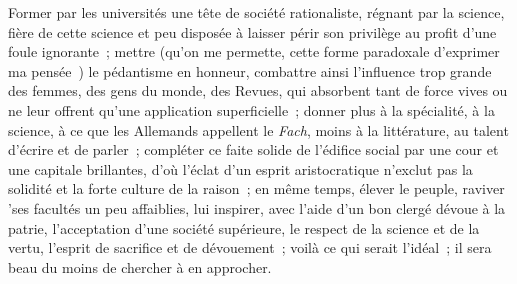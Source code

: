 \documentclass[french,twoside]{book} %
\begin{document}
Former par les universités une tête de société rationaliste, régnant par la science, fière de cette science et peu disposée à laisser périr son privilège au profit d’une foule ignorante ; mettre (qu’on me permette, cette forme paradoxale d’exprimer ma pensée ) le pédantisme en honneur, combattre ainsi l’influence trop grande des femmes, des gens du monde, des Revues, qui absorbent tant de force vives ou ne leur offrent qu’une application superficielle ; donner plus à la spécialité, à la science, à ce que les Allemands appellent le {\itshape Fach}, moins à la littérature, au talent d’écrire et de parler ; compléter ce faite solide de l’édifice social par une cour et une capitale brillantes, d’où l’éclat d’un esprit aristocratique n’exclut pas la solidité et la forte culture de la raison ; en même temps, élever le peuple, raviver ’ses facultés un peu affaiblies, lui inspirer, avec l’aide d’un bon clergé dévoue à la patrie, l’acceptation d’une société supérieure, le respect de la science et de la vertu, l’esprit de sacrifice et de dévouement ; voilà ce qui serait l’idéal ; il sera beau du moins de chercher à en approcher.\par
\end{document}
